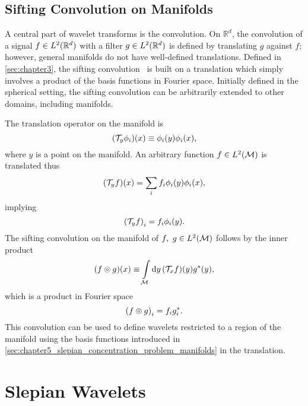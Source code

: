 \subsection{Sifting Convolution on Manifolds}\label{sec:chapter5_sifting_convolution_manifolds}

A central part of wavelet transforms is the convolution.
On \(\mathbb{R}^{d}\), the convolution of a signal \(f \in L^{2}(\mathbb{R}^{d})\) with a filter \(g \in L^{2}(\mathbb{R}^{d})\) is defined by translating \(g\) against \(f\); however, general manifolds do not have well-defined translations.
Defined in \cref{sec:chapter3}, the sifting convolution~\cite{Roddy2021} is built on a translation which simply involves a product of the basis functions in Fourier space.
Initially defined in the spherical setting, the sifting convolution can be arbitrarily extended to other domains, including manifolds.

The translation operator on the manifold is
%
\begin{equation}
	(\mathcal{T}_{y}\phi_{i})(x)
	\equiv \phi_{i}(y) \phi_{i}(x),
\end{equation}
%
where \(y\) is a point on the manifold.
An arbitrary function \(f \in L^{2}(\mathcal{M})\) is translated thus
%
\begin{equation}
	(\mathcal{T}_{y}f)(x)
	= \sum\limits_{i} f_{i} \phi_{i}(y) \phi_{i}(x),
\end{equation}
%
implying
%
\begin{equation}
	{(\mathcal{T}_{y}f)}_{i}
	= f_{i} \phi_{i}(y).
\end{equation}
%
The sifting convolution on the manifold of \(f,\ g \in L^{2}(\mathcal{M})\) follows by the inner product
%
\begin{equation}
	(f \circledcirc{} g)(x)
	\equiv \int\limits_{\mathcal{M}} \dd{y} (\mathcal{T}_{x}f)(y) g^{\ast}(y),
\end{equation}
%
which is a product in Fourier space
%
\begin{equation}
	{(f \circledcirc{} g)}_{i}
	= f_{i} g_{i}^{\ast}.
\end{equation}
%
This convolution can be used to define wavelets restricted to a region of the manifold using the basis functions introduced in \cref{sec:chapter5_slepian_concentration_problem_manifolds} in the translation.

\section{Slepian Wavelets}\label{sec:chapter5_slepian_wavelets}

